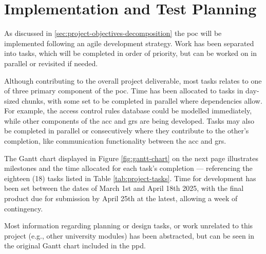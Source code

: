 \section{Implementation and Test Planning}
\label{sec:implementation-and-test-planning}

As discussed in \ref{sec:project-objectives-decomposition} the \ac{poc} will be implemented following an agile development strategy.
Work has been separated into tasks, which will be completed in order of priority, but can be worked on in parallel or revisited if needed.

Although contributing to the overall project deliverable, most tasks relates to one of three primary component of the \ac{poc}.
Time has been allocated to tasks in day-sized chunks, with some set to be completed in parallel where dependencies allow.
For example, the access control rules database could be modelled immediately, while other components of the \ac{acc} and \ac{grs} are being developed.
Tasks may also be completed in parallel or consecutively where they contribute to the other's completion, like communication functionality between the \ac{acc} and \ac{grs}.

The Gantt chart displayed in Figure \ref{fig:gantt-chart} on the next page illustrates milestones and the time allocated for each task's completion --- referencing the eighteen (18) tasks listed in Table \ref{tab:project-tasks}.
Time for development has been set between the dates of March 1st and April 18th 2025, with the final product due for submission by April 25th at the latest, allowing a week of contingency.

Most information regarding planning or design tasks, or work unrelated to this project (e.g., other university modules) has been abstracted, but can be seen in the original Gantt chart included in the \ac{ppd}.

